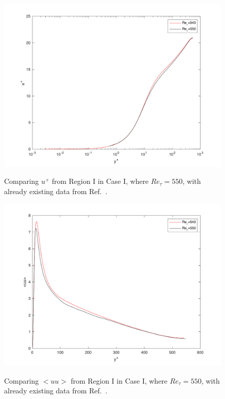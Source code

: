 \documentclass[twocolumn,10pt]{asme2e}
\begin{document}
\begin{figure}[t]
\centering
\scalebox{0.5}
{\includegraphics{comparing_u_543.pdf}}
\caption{Comparing \(u^+\) from Region I in Case I, where \(Re_{\tau}=550\), with already existing data from Ref.~\cite{myoungkyu2015}.}
\label{fig:comparing_u_543}
\end{figure}

\begin{figure}[t]
\centering
\scalebox{0.5}
{\includegraphics{comparing_uu_543.pdf}}
\caption{Comparing \(<uu>\) from Region I in Case I, where \(Re_{\tau}=550\), with already existing data from Ref.~\cite{myoungkyu2015}.}
\label{fig:comparing_uu_543}
\end{figure}
\end{document}
